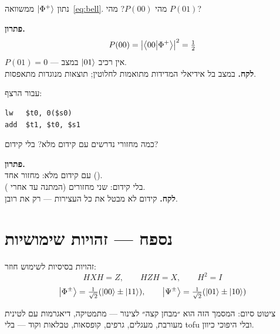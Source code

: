 \begin{exbox}[frametitle={תרגיל 2 — הסתברות במצב בל}]
נתון $\left|\Phi^+\right\rangle$ ממשוואה~\eqref{eq:bell}. מהי $P(00)$? מהי $P(01)$?
\end{exbox}

\begin{keybox}[frametitle={פתרון 2},nobreak=true]
\textbf{פתרון.}
\[ P(00)=\bigl|\left\langle00\middle|\Phi^+\right\rangle\bigr|^2=\tfrac12 \]
$P(01)=0$ — אין רכיב $\left|01\right\rangle$ במצב.\\[4pt]
\textbf{לקח.} במצב בל אידיאלי המדידות מתואמות לחלוטין; תוצאות מנוגדות מתאפסות.
\end{keybox}

\begin{exbox}[frametitle={תרגיל 3 — סכסוך \code{load-use}}]
עבור הרצף:
\begin{asmblock}
\begin{lstlisting}[style=asm]
lw   $t0, 0($s0)
add  $t1, $t0, $s1
\end{lstlisting}
\end{asmblock}
כמה מחזורי  נדרשים עם קידום מלא? בלי קידום?
\end{exbox}

\begin{keybox}[frametitle={פתרון 3},nobreak=true]
\textbf{פתרון.}\\
עם קידום מלא: מחזור  אחד ().\\
בלי קידום: שני מחזורים (המתנה עד אחרי ).\\[4pt]
\textbf{לקח.} קידום לא מבטל את כל העצירות — רק את רובן.
\end{keybox}

\chapter{נספח — זהויות שימושיות}
\label{ch:appendix}

זהויות בסיסיות לשימוש חוזר:
\[ HXH = Z,\qquad HZH = X,\qquad H^2 = I \]
\[
\left|\Phi^\pm\right\rangle=\tfrac1{\sqrt2}(\left|00\right\rangle\pm\left|11\right\rangle),\qquad
\left|\Psi^\pm\right\rangle=\tfrac1{\sqrt2}(\left|01\right\rangle\pm\left|10\right\rangle)
\]

\noindent ציטוט סיום: המסמך הזה הוא ״מבחן קצה״ לצינור —
מתמטיקה, דיאגרמות עם לטינית מעורבת, מעגלים, גרפים, קופסאות, טבלאות וקוד —
בלי tofu ובלי היפוכי כיוון.



